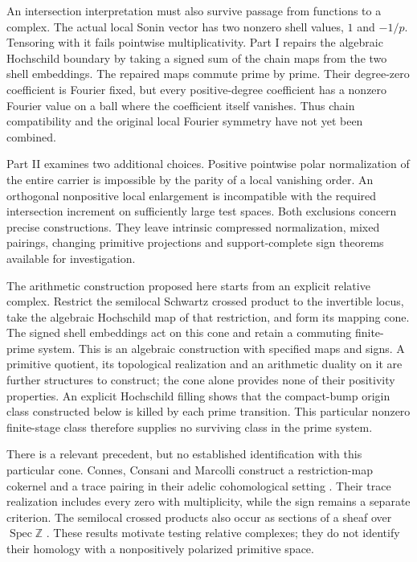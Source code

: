 \documentclass[11pt,letterpaper]{article}
\theoremstyle{definition}
\theoremstyle{remark}
\newcommand{\Z}{\mathbb Z}
\begin{document}
An intersection interpretation must also survive passage from functions
to a complex. The actual local Sonin vector has two nonzero shell values,
$1$ and $-1/p$. Tensoring with it fails pointwise multiplicativity. Part I
\cite{PartI} repairs the algebraic Hochschild boundary by taking a signed
sum of the chain maps from the two shell embeddings. The repaired maps
commute prime by prime. Their degree-zero coefficient is Fourier fixed,
but every positive-degree coefficient has a nonzero Fourier value on a
ball where the coefficient itself vanishes. Thus chain compatibility
and the original local Fourier symmetry have not yet been combined.

Part II \cite{PartII} examines two additional choices. Positive
pointwise polar normalization of the entire carrier is impossible by
the parity of a local vanishing order. An orthogonal nonpositive local
enlargement is incompatible with the required intersection increment
on sufficiently large test spaces. Both exclusions concern precise
constructions. They leave intrinsic compressed normalization, mixed
pairings, changing primitive projections and support-complete sign
theorems available for investigation.

The arithmetic construction proposed here starts from an explicit
relative complex. Restrict the semilocal Schwartz crossed product to
the invertible locus, take the algebraic Hochschild map of that
restriction, and form its mapping cone. The signed shell embeddings
act on this cone and retain a commuting finite-prime system. This is
an algebraic construction with specified maps and signs. A primitive
quotient, its topological realization and an arithmetic duality on it
are further structures to construct; the cone alone provides none of
their positivity properties.
An explicit Hochschild filling shows that the compact-bump origin
class constructed below is killed by each prime transition. This
particular nonzero finite-stage class therefore supplies no surviving
class in the prime system.

There is a relevant precedent, but no established identification with
this particular cone. Connes, Consani and Marcolli construct a
restriction-map cokernel and a trace pairing in their adelic
cohomological setting \cite[Sections 4.2 to 5]{CCMar}. Their trace
realization includes every zero with multiplicity, while the sign
remains a separate criterion. The semilocal crossed products also occur
as sections of a sheaf over $\operatorname{Spec}\Z$
\cite[Section 7.3, Theorem 7.2]{C26}. These results motivate testing
relative complexes; they do not identify their homology with a
nonpositively polarized primitive space.
\end{document}
